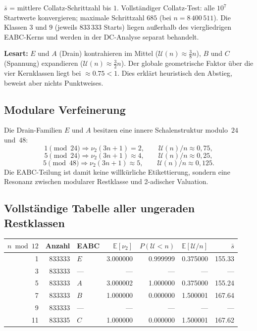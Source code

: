 \documentclass[12pt,a4paper]{article}
\newcommand{\vii}{\nu_2}
\newcommand{\U}{\mathcal{U}}
\begin{document}
\noindent
$\bar s$ = mittlere Collatz-Schrittzahl bis $1$.
Vollständiger Collatz-Test: alle $10^7$ Startwerte konvergieren;
maximale Schrittzahl $685$ (bei $n = 8\,400\,511$).
Die Klassen $3$ und $9$ (jeweils $833\,333$ Starts) liegen außerhalb
des viergliedrigen EABC-Kerns und werden in der DC-Analyse separat
behandelt.

\begin{tcolorbox}[heuristik]
\textbf{Lesart:} $E$ und $A$ (Drain) kontrahieren im Mittel
($\U(n) \approx \tfrac{3}{8}n$), $B$ und $C$ (Spannung) expandieren
($\U(n) \approx \tfrac{3}{2}n$). Der globale geometrische Faktor über
die vier Kernklassen liegt bei $\approx 0.75 < 1$.
Dies erklärt heuristisch den Abstieg, beweist aber nichts Punktweises.
\end{tcolorbox}

\subsection{Modulare Verfeinerung}

Die Drain-Familien $E$ und $A$ besitzen eine innere Schalenstruktur
modulo~$24$ und~$48$:
\[
1 \pmod{24}\Rightarrow \vii(3n+1)=2,\qquad \U(n)/n\approx 0{,}75,
\]
\[
5 \pmod{24}\Rightarrow \vii(3n+1)\approx 4,\qquad \U(n)/n\approx 0{,}25,
\]
\[
5 \pmod{48}\Rightarrow \vii(3n+1)\approx 5,\qquad \U(n)/n\approx 0{,}125.
\]
Die EABC-Teilung ist damit keine willkürliche Etikettierung, sondern eine
Resonanz zwischen modularer Restklasse und 2-adischer Valuation.

\subsection{Vollständige Tabelle aller ungeraden Restklassen}

\begin{center}
\renewcommand{\arraystretch}{1.3}
\begin{tabular}{rrlrrrr}
\toprule
$n \bmod 12$ & Anzahl & EABC & $\mathbb{E}[\vii]$ & $P(\U<n)$ & $\mathbb{E}[\U/n]$ & $\bar s$ \\
\midrule
1 & 833333 & $E$ & 3.000000 & 0.999999 & 0.375000 & 155.33 \\
3 & 833333 & --- & --- & --- & --- & --- \\
5 & 833333 & $A$ & 3.000002 & 1.000000 & 0.375000 & 155.24 \\
7 & 833333 & $B$ & 1.000000 & 0.000000 & 1.500001 & 167.64 \\
9 & 833333 & --- & --- & --- & --- & --- \\
11 & 833335 & $C$ & 1.000000 & 0.000000 & 1.500001 & 167.62 \\
\bottomrule
\end{tabular}
\end{center}
\end{document}
